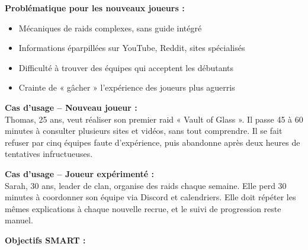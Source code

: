 \vspace{0.5em}

\textbf{Problématique pour les nouveaux joueurs :}

\begin{itemize}
    \itemsep0.5em
    \item Mécaniques de raids complexes, sans guide intégré
    \item Informations éparpillées sur YouTube, Reddit, sites spécialisés
    \item Difficulté à trouver des équipes qui acceptent les débutants
    \item Crainte de « gâcher » l'expérience des joueurs plus aguerris
\end{itemize}

\vspace{0.5em}

\textbf{Cas d'usage – Nouveau joueur :} \\
Thomas, 25 ans, veut réaliser son premier raid « Vault of Glass ». Il passe 45 à 60 minutes à consulter plusieurs sites et vidéos, sans tout comprendre. Il se fait refuser par cinq équipes faute d'expérience, puis abandonne après deux heures de tentatives infructueuses.

\vspace{0.5em}

\textbf{Cas d'usage – Joueur expérimenté :} \\
Sarah, 30 ans, leader de clan, organise des raids chaque semaine. Elle perd 30 minutes à coordonner son équipe via Discord et calendriers. Elle doit répéter les mêmes explications à chaque nouvelle recrue, et le suivi de progression reste manuel.

\vspace{0.5em}

\textbf{Objectifs SMART :}

